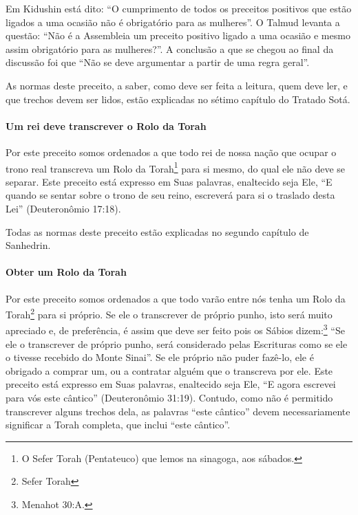 Em Kidushin está dito: ``O cumprimento de todos os preceitos positivos
que estão ligados a uma ocasião não é obrigatório para as mulheres''. O
Talmud levanta a questão: ``Não é a Assembleia um preceito positivo
ligado a uma ocasião e mesmo assim obrigatório para as mulheres?''. A
conclusão a que se chegou ao final da discussão foi que ``Não se deve
argumentar a partir de uma regra geral''.

As normas deste preceito, a saber, como deve ser feita a leitura, quem
deve ler, e que trechos devem ser lidos, estão explicadas no sétimo
capítulo do Tratado Sotá.

\paragraph{Um rei deve transcrever o Rolo da Torah}

Por este preceito somos ordenados a que todo rei de nossa nação que
ocupar o trono real transcreva um Rolo da Torah\footnote{O Sefer Torah (Pentateuco) que lemos na sinagoga, aos sábados.}
para si mesmo, do qual ele não deve se separar. Este preceito está
expresso em Suas palavras, enaltecido seja Ele, ``E quando se sentar
sobre o trono de seu reino, escreverá para si o traslado desta Lei''
(Deuteronômio 17:18).

Todas as normas deste preceito estão explicadas no segundo capítulo de
Sanhedrin.

\paragraph{Obter um Rolo da Torah}

Por este preceito somos ordenados a que todo varão entre nós tenha um Rolo da Torah\footnote{Sefer Torah} para si próprio. Se ele o transcrever de próprio punho, isto será muito apreciado e, de preferência, é assim que deve ser feito
pois os Sábios dizem:\footnote{Menahot 30:A.} ``Se ele o transcrever de
próprio punho, será considerado pelas Escrituras como se ele o tivesse recebido do Monte Sinai''. Se ele
próprio não puder fazê-lo, ele é obrigado a comprar um, ou a contratar
alguém que o transcreva por ele. Este preceito está expresso em Suas palavras,
enaltecido seja Ele, ``E agora escrevei para vós este cântico''
(Deuteronômio 31:19). Contudo, como não é permitido transcrever alguns
trechos dela, as palavras ``este cântico'' devem necessariamente
significar a Torah completa, que inclui ``este cântico''.


